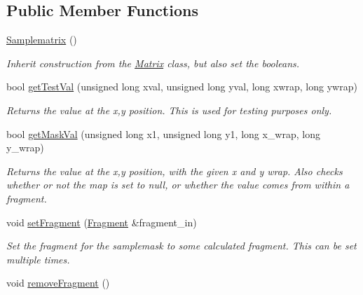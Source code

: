 \subsection*{Public Member Functions}
\begin{DoxyCompactItemize}
\item 
\hyperlink{class_samplematrix_abe3fb4ca1e24678f2720f451cee80492}{Samplematrix} ()\hypertarget{class_samplematrix_abe3fb4ca1e24678f2720f451cee80492}{}\label{class_samplematrix_abe3fb4ca1e24678f2720f451cee80492}

\begin{DoxyCompactList}\small\item\em Inherit construction from the \hyperlink{class_matrix}{Matrix} class, but also set the booleans. \end{DoxyCompactList}\item 
bool \hyperlink{class_samplematrix_a834c750ab142d1ed2241fb9ab559b704}{get\+Test\+Val} (unsigned long xval, unsigned long yval, long xwrap, long ywrap)
\begin{DoxyCompactList}\small\item\em Returns the value at the x,y position. This is used for testing purposes only. \end{DoxyCompactList}\item 
bool \hyperlink{class_samplematrix_a8b494886260857ffdc9f52f47661a628}{get\+Mask\+Val} (unsigned long x1, unsigned long y1, long x\+\_\+wrap, long y\+\_\+wrap)
\begin{DoxyCompactList}\small\item\em Returns the value at the x,y position, with the given x and y wrap. Also checks whether or not the map is set to null, or whether the value comes from within a fragment. \end{DoxyCompactList}\item 
void \hyperlink{class_samplematrix_adbc1732a726c387965f63d4484bd4c25}{set\+Fragment} (\hyperlink{struct_fragment}{Fragment} \&fragment\+\_\+in)
\begin{DoxyCompactList}\small\item\em Set the fragment for the samplemask to some calculated fragment. This can be set multiple times. \end{DoxyCompactList}\item 
void \hyperlink{class_samplematrix_a9b796f2279f1716c2a555ff3d641ea0b}{remove\+Fragment} ()\hypertarget{class_samplematrix_a9b796f2279f1716c2a555ff3d641ea0b}{}\label{class_samplematrix_a9b796f2279f1716c2a555ff3d641ea0b}


\end{DoxyCompactItemize}
